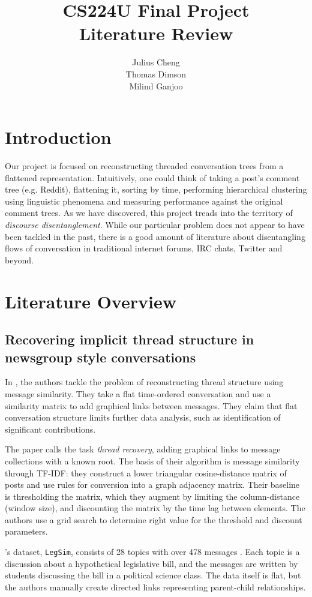 \documentclass{article}
\title{CS224U Final Project \\Literature Review}
\author{Julius Cheng\\ Thomas Dimson \\ Milind Ganjoo}
\begin{document}
\maketitle

\section{Introduction}
Our project is focused on reconstructing threaded conversation trees from a
flattened representation. Intuitively, one could think of taking a post's
comment tree (e.g. Reddit), flattening it, sorting by time, performing
hierarchical clustering using linguistic phenomena and measuring performance
against the original comment trees. As we have discovered, this project treads
into the territory of \textit{discourse disentanglement}. While our particular
problem does not appear to have been tackled in the past, there is a good
amount of literature about disentangling flows of conversation in traditional
internet forums, IRC chats, Twitter and beyond.

\section{Literature Overview}
\subsection{Recovering implicit thread structure in newsgroup style
conversations} In \cite{Wang2008a}, the authors tackle the problem of
reconstructing thread structure using message similarity. They take a flat
time-ordered conversation and use a similarity matrix to add graphical links
between messages. They claim that flat conversation structure limits further
data analysis, such as identification of significant contributions.

The paper calls the task \textit{thread recovery}, adding graphical links to
message collections with a known root. The basis of their algorithm is message
similarity through TF-IDF: they construct a lower triangular cosine-distance
matrix of posts and use rules for conversion into a graph adjacency matrix.
Their baseline is thresholding the matrix, which they augment by limiting the
column-distance (window size), and discounting the matrix by the time lag
between elements. The authors use a grid search to determine right value for
the threshold and discount parameters.

\cite{Wang2008a}'s dataset, \texttt{LegSim}, consists of 28 topics with over 
478 messages . Each topic is a discussion about a hypothetical legislative 
bill, and the messages are written by students discussing the bill in a 
political science class. The data itself is flat, but  the authors manually 
create directed links representing parent-child relationships.
\end{document}
